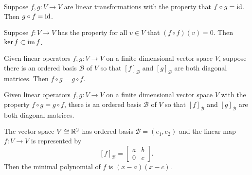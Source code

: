 \documentclass{homework}
\begin{document}
\begin{problem}
  Suppose $f, g: V \to V$ are linear transformations with the property that $f \circ g = \operatorname{id}$.  Then $g \circ f = \operatorname{id}$.
\end{problem}

\begin{problem}
  Suppose $f : V \to V$ has the property for all $v \in V$ that $(f \circ f)(v) = 0$.  Then $\ker f \subset \operatorname{im} f$.
\end{problem}

\begin{problem}\label{simultaneous-diagonalizability-commute}Given
  linear operators $f, g : V \to V$ on a finite dimensional vector
  space $V$, suppose there is an ordered basis $\mathcal{B}$ of $V$ so
  that $[f]_{\mathcal{B}}$ and $[g]_{\mathcal{B}}$ are both diagonal
  matrices.  Then $f \circ g = g \circ f$.
\end{problem}

\begin{problem}
  Given linear operators $f, g : V \to V$ on a finite dimensional
  vector space $V$ with the property $f \circ g = g \circ f$, there is
  an ordered basis $\mathcal{B}$ of $V$ so that $[f]_{\mathcal{B}}$
  and $[g]_{\mathcal{B}}$ are both diagonal matrices.
\end{problem}

\begin{problem}
  The vector space $V \cong \mathbb{R}^2$ has ordered basis $\mathcal{B} = (e_1,e_2)$ and the linear map $f : V \to V$ is represented by
  \[
    [f]_{\mathcal{B}} = \begin{bmatrix} a & b \\ 0 & c \end{bmatrix}.
  \]
  Then the minimal polynomial of $f$ is $(x-a)(x-c)$.
\end{problem}
\end{document}
